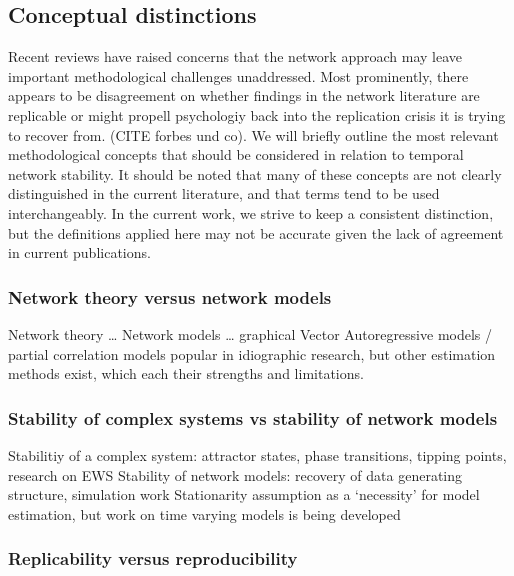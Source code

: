 \documentclass[
  english,
  man]{apa6}
\begin{document}
\hypertarget{conceptual-distinctions}{%
\subsection{Conceptual distinctions}\label{conceptual-distinctions}}

Recent reviews have raised concerns that the network approach may leave important methodological challenges unaddressed.
Most prominently, there appears to be disagreement on whether findings in the network literature are replicable or might propell psychologiy back into the replication crisis it is trying to recover from.
(CITE forbes und co).
We will briefly outline the most relevant methodological concepts that should be considered in relation to temporal network stability.
It should be noted that many of these concepts are not clearly distinguished in the current literature, and that terms tend to be used interchangeably.
In the current work, we strive to keep a consistent distinction, but the definitions applied here may not be accurate given the lack of agreement in current publications.

\hypertarget{network-theory-versus-network-models}{%
\subsubsection{Network theory versus network models}\label{network-theory-versus-network-models}}

Network theory \ldots{} Network models \ldots{} graphical Vector Autoregressive models / partial correlation models popular in idiographic research, but other estimation methods exist, which each their strengths and limitations.

\hypertarget{stability-of-complex-systems-vs-stability-of-network-models}{%
\subsubsection{Stability of complex systems vs stability of network models}\label{stability-of-complex-systems-vs-stability-of-network-models}}

Stabilitiy of a complex system: attractor states, phase transitions, tipping points, research on EWS Stability of network models: recovery of data generating structure, simulation work Stationarity assumption as a `necessity' for model estimation, but work on time varying models is being developed

\hypertarget{replicability-versus-reproducibility}{%
\subsubsection{Replicability versus reproducibility}\label{replicability-versus-reproducibility}}
\end{document}
